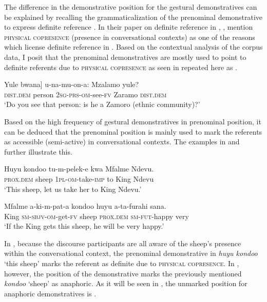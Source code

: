 \documentclass[output=paper,
modfonts
]{langscibook}
\begin{document}
The difference in the demonstrative position for the gestural demonstratives can be explained by recalling the grammaticalization of the  prenominal demonstrative to express definite reference \citep{Ashton1944,Givón1976,Carstens1991,Carstens2008}. In their paper on definite reference in , \citet[38]{ClarkMarshall1981}, mention \textsc{physical copresence} (presence in conversational contexts) as one of the reasons which license definite reference in . Based on the contextual analysis of the corpus data, I posit that the prenominal demonstratives are mostly used to point to definite referents due to \textsc{physical copresence} as seen in  repeated here as .

\ea\label{ex:mwamzandi:13}
\gll  {\ob}Yule bwana] u-na-mu-on-a: Mzalamo yule?\\
     {\db}\textsc{dist}.\textsc{dem} person \textsc{2sg}{}-\textsc{prs}{}-\textsc{om}{}-see-\textsc{fv} Zaramo \textsc{dist}.\textsc{dem}\\
\glt ‘Do you see that person: is he a Zamoro (ethnic community)?’
\z

Based on the high frequency of gestural demonstratives in prenominal position, it can be deduced that the prenominal position is mainly used to mark the referents as accessible (semi-active) in conversational contexts. The examples in  and  further illustrate this.

\ea\label{ex:mwamzandi:14}
\gll  Huyu kondoo tu-m-pelek-e kwa Mfalme Ndevu.\\
     \textsc{prox}.\textsc{dem} sheep \textsc{1pl}{}-\textsc{om}{}-take-\textsc{imp} to King Ndevu\\
\glt ‘This sheep, let us take her to King Ndevu.’
\z

\ea\label{ex:mwamzandi:15}
\gll  Mfalme a-ki-m-pat-a kondoo huyu a-ta-furahi sana.\\
     King \textsc{sm}{}-\textsc{sbjv}{}-\textsc{om}{}-get-\textsc{fv} sheep \textsc{prox}.\textsc{dem} \textsc{sm}{}-\textsc{fut}{}-happy very\\
\glt ‘If the King gets this sheep, he will be very happy.’
\z

In , because the discourse participants are all aware of the sheep’s presence within the conversational context, the prenominal demonstrative in \textit{huyu kondoo} ‘this sheep’ marks the referent as definite due to \textsc{physical copresence}. In , however, the  position of the demonstrative marks the previously mentioned \textit{kondoo} ‘sheep’ as anaphoric. As it will be seen in , the unmarked position for anaphoric demonstratives is .
\end{document}

